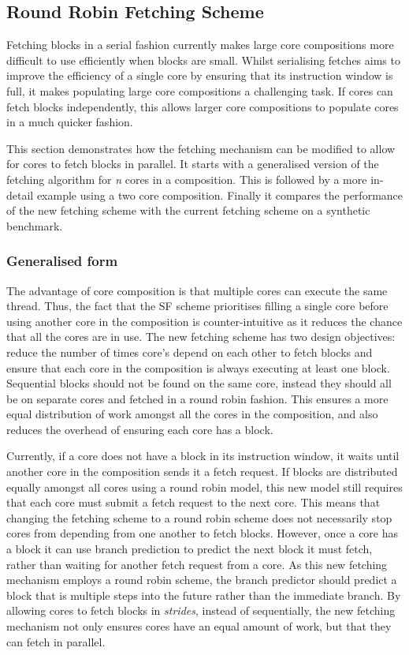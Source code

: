 \subsection{Round Robin Fetching Scheme}

Fetching blocks in a serial fashion currently makes large core compositions more difficult to use efficiently when blocks are small.
Whilst serialising fetches aims to improve the efficiency of a single core by ensuring that its instruction window is full, it makes populating large core compositions a challenging task.
If cores can fetch blocks independently, this allows larger core compositions to populate cores in a much quicker fashion.

This section demonstrates how the fetching mechanism can be modified to allow for cores to fetch blocks in parallel.
It starts with a generalised version of the fetching algorithm for \textit{n} cores in a composition.
This is followed by a more in-detail example using a two core composition.
Finally it compares the performance of the new fetching scheme with the current fetching scheme on a synthetic benchmark.

\subsubsection{Generalised form}
The advantage of core composition is that multiple cores can execute the same thread.
Thus, the fact that the SF scheme prioritises filling a single core before using another core in the composition is counter-intuitive as it reduces the chance that all the cores are in use.
The new fetching scheme has two design objectives: reduce the number of times core's depend on each other to fetch blocks and ensure that each core in the composition is always executing at least one block.
Sequential blocks should not be found on the same core, instead they should all be on separate cores and fetched in a round robin fashion.
This ensures a more equal distribution of work amongst all the cores in the composition, and also reduces the overhead of ensuring each core has a block.

Currently, if a core does not have a block in its instruction window, it waits until another core in the composition sends it a fetch request.
If blocks are distributed equally amongst all cores using a round robin model, this new model still requires that each core must submit a fetch request to the next core.
This means that changing the fetching scheme to a round robin scheme does not necessarily stop cores from depending from one another to fetch blocks.
However, once a core has a block it can use branch prediction to predict the next block it must fetch, rather than waiting for another fetch request from a core.
As this new fetching mechanism employs a round robin scheme, the branch predictor should predict a block that is multiple steps into the future rather than the immediate branch.
By allowing cores to fetch blocks in \textit{strides}, instead of sequentially, the new fetching mechanism not only ensures cores have an equal amount of work, but that they can fetch in parallel.

